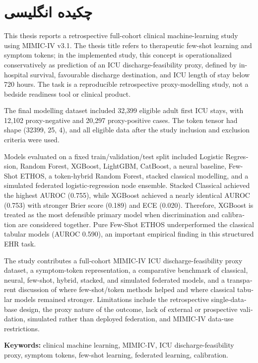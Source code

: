 \chapter*{چکیده انگلیسی}
\begin{latin}
\small
\noindent
This thesis reports a retrospective full-cohort clinical machine-learning study using MIMIC-IV v3.1. The thesis title refers to therapeutic few-shot learning and symptom tokens; in the implemented study, this concept is operationalized conservatively as prediction of an ICU discharge-feasibility proxy, defined by in-hospital survival, favourable discharge destination, and ICU length of stay below 720 hours. The task is a reproducible retrospective proxy-modelling study, not a bedside readiness tool or clinical product.

The final modelling dataset included 32,399 eligible adult first ICU stays, with 12,102 proxy-negative and 20,297 proxy-positive cases. The token tensor had shape (32399, 25, 4), and all eligible data after the study inclusion and exclusion criteria were used.

Models evaluated on a fixed train/validation/test split included Logistic Regression, Random Forest, XGBoost, LightGBM, CatBoost, a neural baseline, Few-Shot ETHOS, a token-hybrid Random Forest, stacked classical modelling, and a simulated federated logistic-regression node ensemble. Stacked Classical achieved the highest AUROC (0.755), while XGBoost achieved a nearly identical AUROC (0.753) with stronger Brier score (0.189) and ECE (0.020). Therefore, XGBoost is treated as the most defensible primary model when discrimination and calibration are considered together. Pure Few-Shot ETHOS underperformed the classical tabular models (AUROC 0.590), an important empirical finding in this structured EHR task.

The study contributes a full-cohort MIMIC-IV ICU discharge-feasibility proxy dataset, a symptom-token representation, a comparative benchmark of classical, neural, few-shot, hybrid, stacked, and simulated federated models, and a transparent discussion of where few-shot/token methods helped and where classical tabular models remained stronger. Limitations include the retrospective single-database design, the proxy nature of the outcome, lack of external or prospective validation, simulated rather than deployed federation, and MIMIC-IV data-use restrictions.

\vspace{1em}
\noindent\textbf{Keywords:} clinical machine learning, MIMIC-IV, ICU discharge-feasibility proxy, symptom tokens, few-shot learning, federated learning, calibration.
\end{latin}
\cleardoublepage
